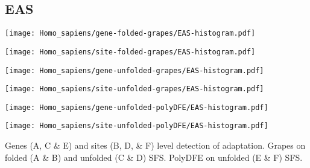 \documentclass{article}
\begin{document}
\subsection{EAS}
\centering
\begin{minipage}{0.49\linewidth}
    \texttt{[image: Homo\_sapiens/gene-folded-grapes/EAS-histogram.pdf]}
\end{minipage}%
\hfill
\begin{minipage}{0.49\linewidth}
    \texttt{[image: Homo\_sapiens/site-folded-grapes/EAS-histogram.pdf]}
\end{minipage}
\hfill
\begin{minipage}{0.49\linewidth}
    \texttt{[image: Homo\_sapiens/gene-unfolded-grapes/EAS-histogram.pdf]}
\end{minipage}%
\hfill
\begin{minipage}{0.49\linewidth}
    \texttt{[image: Homo\_sapiens/site-unfolded-grapes/EAS-histogram.pdf]}
\end{minipage}
\hfill
\begin{minipage}{0.49\linewidth}
    \texttt{[image: Homo\_sapiens/gene-unfolded-polyDFE/EAS-histogram.pdf]}
\end{minipage}%
\hfill
\begin{minipage}{0.49\linewidth}
    \texttt{[image: Homo\_sapiens/site-unfolded-polyDFE/EAS-histogram.pdf]}
\end{minipage}
\hfill
\flushleft
Genes (A, C \& E) and sites (B, D, \& F) level detection of adaptation.
Grapes on folded (A \& B) and unfolded (C \& D) SFS.
PolyDFE on unfolded (E \& F) SFS.

\pagebreak
\end{document}
